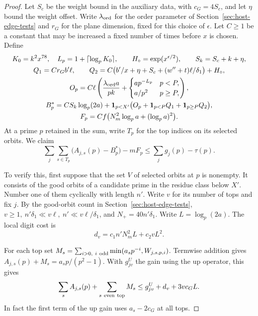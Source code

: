 \begin{proof}
Let \(S_c\) be the weight bound in the auxiliary data, with
\(c_G=4S_c\), and let \(\eta\) bound the weight offset.
Write \(\lambda_{\rm ord}\) for the order parameter of
Section~\ref{sec:host-edge-tests} and \(r_G\) for the plane
dimension, fixed for this choice of \(\epsilon\).
Let \(C\ge1\) be a constant that may be increased a fixed
number of times before \(x\) is chosen. Define
\[
 \begin{gathered}
 K_0=k^2x^{78},\quad L_p=1+\lceil\log_p K_0\rceil,\qquad
 H_\circ=\exp(x^{\epsilon/2}),\qquad S_k=S_c+k+\eta,\\
 Q_1=C r_G b'\ell,\qquad
 Q_2=C\bigl(b'/x+\eta+S_c+(w''+t)\ell/\delta_1\bigr)+H_\circ,\\
 O_p=C\ell\left(\frac{\lambda_{\rm ord} a}{pk}
       +\begin{cases}a p^{-L_p}&p<P,\\ a/p^2&p\ge P,\end{cases}\right),\\
 B_p^*=C S_k\log_p(2a)+{\bf1}_{p<X'}
                \bigl(O_p+{\bf1}_{p<P}Q_1+{\bf1}_{p\ge P}Q_2\bigr),\\
 F_p=Cf\bigl(N_m^2\log_p a+(\log_p a)^2\bigr).
 \end{gathered}
\]
At a prime \(p\) retained in the sum, write \(T_p\) for the
top indices on its selected orbits. We claim
\begin{equation}\label{eq:top-service-prime}
 \sum_j\sum_{s\in T_p}\big(A_{j,s}(p)-B_p^*\big)-m F_p
                  \le \sum_jg_j(p)-\tau(p).
\end{equation}

To verify this, first suppose that the set \(V\) of selected orbits
at \(p\) is nonempty. It consists of the good orbits of a candidate
prime in the residue class below \(X'\). Number one of them cyclically
with length \(n'\). Write \(v\) for its number of tops and fix \(j\).
By the good-orbit count in Section~\ref{sec:host-edge-tests},
\(v\ge1,\ n'\delta_1\ll v\ell,\ n'\ll v\ell/\delta_1\), and
\(N_+=40n'\delta_1\). Write \(L=\log_p(2a)\). The local digit cost is
\[
 d_v=c_1 n' N_m^2L+c_2 vL^2.
\]

For each top set \(M_s=\sum_{i>0,\ i\ {\rm odd}}
\min(a_sp^{-i},W_{j,s,p,i})\).
Termwise addition gives \(A_{j,s}(p)+M_s=a_s p/(p^2-1)\).
With \(g^U_{jv}\) the gain using the up operator, this gives
\begin{equation}\label{eq:orbit-min-balance}
 \sum_{s}A_{j,s}(p)+\sum_{s\ {\rm even\ top}} M_s
                  \le g^U_{jv}+d_v+3v c_G L .
\end{equation}
In fact the first term of the up gain uses \(a_s-2c_G\) at all
tops.


\end{proof}
